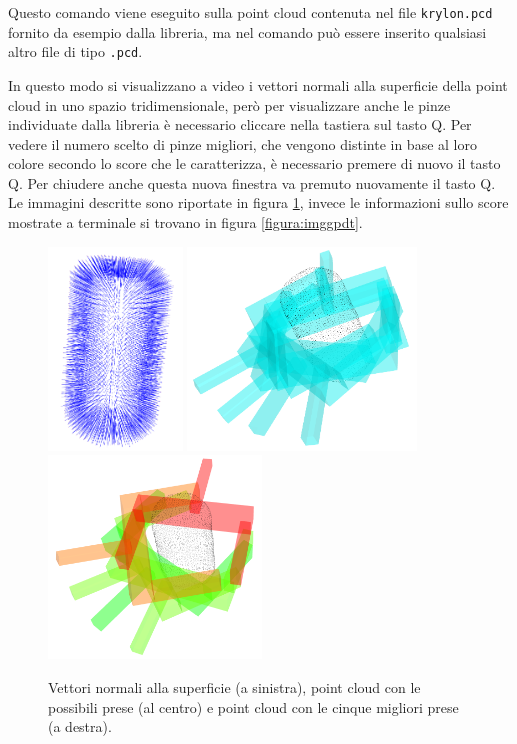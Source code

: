 \documentclass{report}
\begin{document}
Questo comando viene eseguito sulla point cloud contenuta nel file \texttt{krylon.pcd} fornito da esempio dalla libreria, ma nel comando può essere inserito qualsiasi altro file di tipo \texttt{.pcd}. \par
In questo modo si visualizzano a video i vettori normali alla superficie della point cloud in uno spazio tridimensionale, però per visualizzare anche le pinze individuate dalla libreria è necessario cliccare nella tastiera sul tasto Q. Per vedere il numero scelto di pinze migliori, che  vengono distinte in base al loro colore secondo lo score che le caratterizza, è necessario premere di nuovo il tasto Q. Per chiudere anche questa nuova finestra va premuto nuovamente il tasto Q. Le immagini descritte sono riportate in figura \ref{figura:imggpd}, invece le informazioni sullo score mostrate a terminale si trovano in figura \ref{figura:imggpdt}.
\begin{figure}[h!]
	\centering
	\includegraphics[height=5.4cm]{immagini/gpd1}
	\includegraphics[height=5.4cm]{immagini/gpd2}
	\includegraphics[height=5.4cm]{immagini/gpd3}
	\caption{Vettori normali alla superficie (a sinistra), point cloud con le possibili prese (al centro) e point cloud con le cinque migliori prese (a destra).}
	\label{figura:imggpd}
\end{figure}
\end{document}
